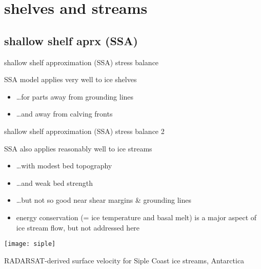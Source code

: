 
\section{shelves and streams}


\subsection{shallow shelf aprx (SSA)}

\begin{frame}{shallow shelf approximation (SSA) stress balance}
  
SSA model applies very well to \alert{ice shelves}
\begin{itemize}
\item \dots for parts away from grounding lines
\item \dots and away from calving fronts
\end{itemize}
\end{frame}


\begin{frame}{shallow shelf approximation (SSA) stress balance 2}

SSA also applies reasonably well to \alert{ice streams}
\begin{itemize}
\item \dots with modest bed topography
\item \dots and weak bed strength
\item \dots but not so good near shear margins \& grounding lines
\item energy conservation (= ice temperature and basal melt) is a major aspect of ice stream flow, but not addressed here
\end{itemize}

\begin{center}
  \texttt{[image: siple]}

\tiny RADARSAT-derived surface velocity for Siple Coast ice streams, Antarctica 
\end{center}
\end{frame}


